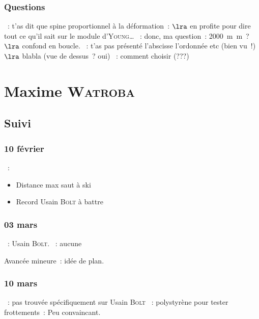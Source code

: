 \documentclass[a4paper, 11pt, final, garamond]{book}
\begin{document}
\subsection{Questions}
\begin{itemize}
  ~: t'as dit que spine proportionnel à la déformation~:
    $\lra$ en profite pour dire tout ce qu'il sait sur le module
    d'\textsc{Young}…
  ~: donc, ma question~: \SI{2000}{m m}~?
    $\lra$ confond en boucle.
  ~: t'as pas présenté l'abscisse l'ordonnée etc (bien vu~!)
    $\lra$ blabla (vue de dessus~? oui)
  ~: comment choisir (???)
\end{itemize}

\chapter{Maxime \textsc{Watroba}}
\label{ch:maxime}
\section{Suivi}
\subsection{10 février}
\begin{itemize}
    ~:
        \begin{itemize}
            \item Distance max saut à ski
            \item Record Usain \textsc{Bolt} à battre
        \end{itemize}
\end{itemize}

\subsection{03 mars}
\begin{itemize}
    ~: Usain \textsc{Bolt}.
    ~: aucune
\end{itemize}

\begin{center}
    Avancée mineure~: idée de plan.
\end{center}

\subsection{10 mars}
\begin{itemize}
    ~: pas trouvée spécifiquement sur Usain \textsc{Bolt}
    ~: polystyrène pour tester frottements~: Peu convaincant.
\end{itemize}
\end{document}
